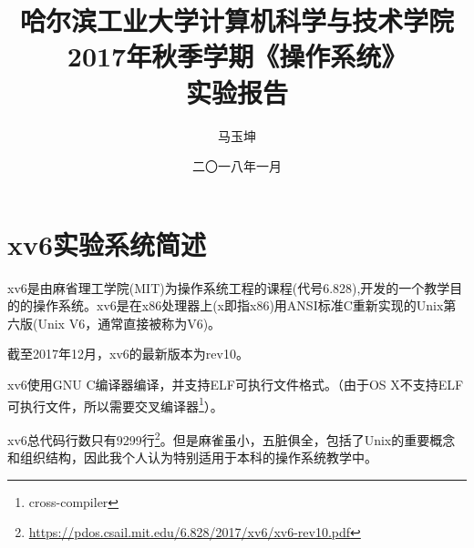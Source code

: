 \documentclass[forprint]{WHUBachelor}
\begin{document}

\title{{\Large 哈尔滨工业大学计算机科学与技术学院\\2017年秋季学期《操作系统》} \\ 实验报告}
\author{马玉坤}                            %
\date{二〇一八年一月}                    %
\newcommand{\shell}[1]{\indent\indent\texttt{\footnotesize\# #1}\\}

\maketitle
\frontmatter
{}              %
\tableofcontents
\mainmatter %

\chapter{xv6实验系统简述}

xv6\cite{xv6-doc}\cite{xv6-github}是由麻省理工学院(MIT)为操作系统工程的课程(代号6.828),开发的一个教学目的的操作系统。xv6是在x86处理器上(x即指x86)用ANSI标准C重新实现的Unix第六版(Unix V6，通常直接被称为V6)。

截至2017年12月，xv6的最新版本为rev10。

xv6使用GNU C编译器编译，并支持ELF可执行文件格式。（由于OS X不支持ELF可执行文件，所以需要交叉编译器\footnote{cross-compiler}）。

xv6总代码行数只有9299行\footnote{\url{https://pdos.csail.mit.edu/6.828/2017/xv6/xv6-rev10.pdf}}。但是麻雀虽小，五脏俱全，包括了Unix的重要概念和组织结构，因此我个人认为特别适用于本科的操作系统教学中。
\end{document}
